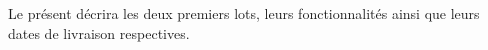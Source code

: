 
Le présent \DSI{} décrira les deux premiers lots, leurs fonctionnalités ainsi que leurs dates de livraison respectives.


	





